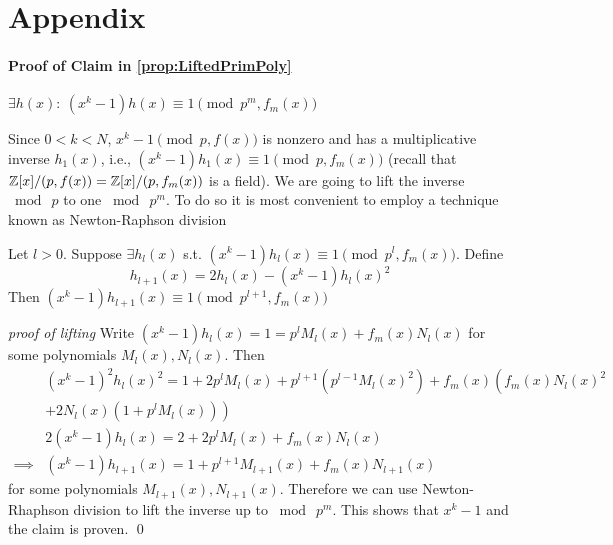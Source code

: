\clearpage\section{Appendix}
\paragraph{\bf Proof of Claim in \cref{prop:LiftedPrimPoly}}
\(\exists h(x):\: (x^k - 1)h(x) \equiv 1 \pmod{p^m, f_m(x)}\)
\begin{ext_proof}\label{proof:LiftedPrimPoly}
    Since \(0 < k < N\), \(x^k - 1 \pmod{p, f(x)}\) is nonzero and has a multiplicative inverse \(h_1(x)\), i.e., \((x^k - 1)h_1(x) \equiv 1 \pmod{p, f_m(x)}\) (recall that \(\mathbb{Z}[x]/(p, f(x)) = \mathbb{Z}[x]/(p, f_m(x))\) is a field). We are going to lift the inverse \(\bmod \  p\) to one \(\bmod \  p^m\). To do so it is most convenient to employ a technique known as Newton-Raphson division~\cite{MISC:WikiNewton}

    \smallskip
    Let \(l > 0\). Suppose \(\exists h_l(x)\) s.t. \((x^k - 1)h_l(x) \equiv 1 \pmod{p^l, f_m(x)}\). Define
    \[h_{l+1}(x) = 2 h_l(x) - (x^k - 1)h_l(x)^2\]
    Then \((x^k - 1)h_{l+1}(x) \equiv 1 \pmod{p^{l+1}, f_m(x)}\)

    \noindent\emph{proof of lifting} \quad Write \((x^k - 1)h_l(x) = 1 = p^l M_l(x) + f_m(x) N_l(x)\) for some polynomials \(M_l(x), N_l(x)\). Then
    \begin{align*}
        &(x^k - 1)^2h_l(x)^2 = 1 + 2p^l M_l(x) + p^{l+1}(p^{l-1}M_l(x)^2) + f_m(x)\left(f_m(x) N_l(x)^2  \right.\\
        &\left. + 2 N_l(x) (1 + p^l M_l(x)) \right) \\
        &2(x^k - 1)h_l(x) = 2 + 2p^l M_l(x) + f_m(x) N_l(x) \\
        \implies &(x^k - 1)h_{l+1}(x) = 1 + p^{l+1} M_{l+1}(x) + f_m(x) N_{l+1}(x)
    \end{align*}
    for some polynomials \(M_{l+1}(x), N_{l+1}(x)\). Therefore we can use Newton-Rhaphson division to lift the inverse up to \(\bmod \  p^m\). This shows that \(x^k - 1\) and the claim is proven. \hfill \qed
\end{ext_proof}

